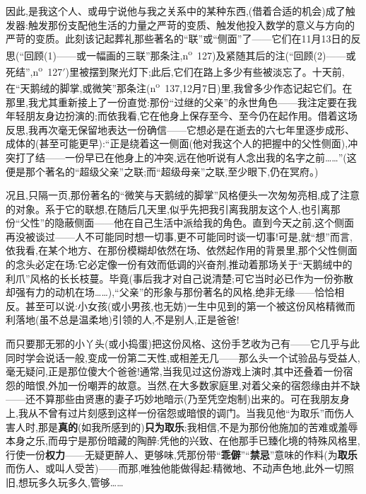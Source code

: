因此,是我这个人、或毋宁说他与我之关系中的某种东西,(借着合适的机会)成了触发器:触发那份支配他生活的力量之严苛的变质、触发他投入数学的意义与方向的严苛的变质。此刻该记起葬礼那些著名的“联”或“侧面”了——它们在11月13日的反思(“回顾(1)——或一幅画的三联”那条注,n\textsuperscript{o}~127)及紧随其后的注(“回顾(2)——或死结”,n\textsuperscript{o}~127$'$)里被摆到聚光灯下;此后,它们在路上多少有些被淡忘了。十天前,在“天鹅绒的脚掌,或微笑”那条注(n\textsuperscript{o}~137,12月7日)里,我曾多少作态记起它们。在那里,我尤其重新接上了一份直觉:那份“过继的父亲”的永世角色——我注定要在我年轻朋友身边扮演的;而依我看,它在他身上保存至今、至今仍在起作用。借着这场反思,我再次毫无保留地表达一份确信——它想必是在逝去的六七年里逐步\dmark{}成形、成体的(甚至可能更早):“正是绕着这一侧面(他对我这个人的把握中的父性侧面),冲突打了结——一份早已在他身上的冲突,远在他听说有人念出我的名字之前……”(这便是那个著名的“超级父亲”之联;而“超级母亲”之联,至少眼下,仍在冥府。)

况且,只隔一页,那份著名的“微笑与天鹅绒的脚掌”风格便头一次匆匆亮相,成了注意的对象。系于它的联想,在随后几天里,似乎先把我引离我朋友这个人,也引离那份“父性”的隐蔽侧面——他在自己生活中派给我的角色。直到今天之前,这个侧面再没被谈过——人不可能同时想一切事,更不可能同时谈一切事!可是,就“想”而言,依我看,在某个地方、在那份模糊却依然在场、依然起作用的背景里,那个父性侧面的念头必定在场:它必定像一份有效而低调的兴奋剂,推动着那场关于“天鹅绒中的利爪”风格的长长枝蔓。毕竟(事后我才对自己说清楚;可它当时必已作为一份弥散却强有力的动机在场……),“父亲”的形象与那份著名的风格,绝非无缘——恰恰相反。甚至可以说:小女孩(或小男孩,也无妨)一生中见到的第一个被这份风格精微而利落地(虽不总是温柔地)引领的人,不是别人,正是爸爸!

而只要那无邪的小丫头(或小捣蛋)把这份风格、这份手艺收为己有——它几乎与此同时学会说话一般,变成一份第二天性,或相差无几——那么头一个试验品与受益人,毫无疑问,正是那位傻大个爸爸!通常,当我见过这份游戏上演时,其中还叠着一份宿怨的暗恨,外加一份嘲弄的故意。当然,在大多数家庭里,对着父亲的宿怨缘由并不缺——还不算那些由贤惠的妻子巧妙地暗示(乃至凭空炮制)出来的。可在我朋友身上,我从不曾有过片刻感到这样一份宿怨或暗恨的调门。当我见他“为取乐”而伤人害人时,那是\textbf{真的}(如我\dmark{}所感到的)\textbf{只为取乐};我相信,不是为那份他施加的苦难或羞辱本身之乐,而毋宁是那份暗藏的陶醉:凭他的兴致、在他那手已臻化境的特殊风格里,行使一份\textbf{权力}——无疑更醉人、更够味,凭那份带“\textbf{乖僻}”“\textbf{禁忌}”意味的作料(为\textbf{取乐}而伤人、或叫人受苦)——而那,唯独他能做得起:精微地、不动声色地,此外一切照旧,想玩多久玩多久,管够……

